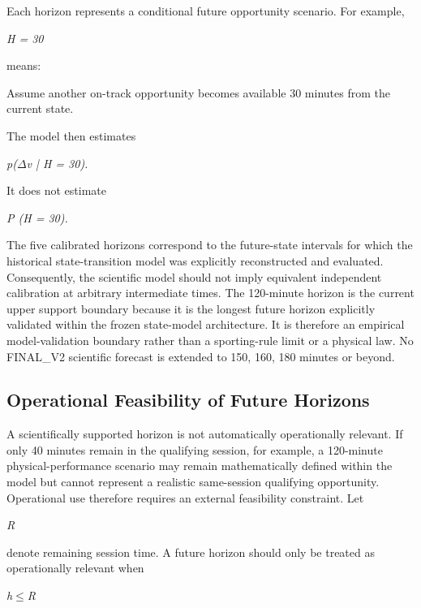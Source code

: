 Each horizon represents a conditional future opportunity scenario. For example,

\begin{center}\textit{H = 30}\end{center}

means:

Assume another on-track opportunity becomes available 30 minutes from the current state.

The model then estimates

\begin{center}\textit{p(\ensuremath{\Delta}v | H = 30).}\end{center}

It does not estimate

\begin{center}\textit{P (H = 30).}\end{center}

The five calibrated horizons correspond to the future-state intervals for which the historical state-transition model was explicitly reconstructed and evaluated. Consequently, the scientific model should not imply equivalent independent calibration at arbitrary intermediate times. The 120-minute horizon is the current upper support boundary because it is the longest future horizon explicitly validated within the frozen state-model architecture. It is therefore an empirical model-validation boundary rather than a sporting-rule limit or a physical law. No FINAL\_V2 scientific forecast is extended to 150, 160, 180 minutes or beyond.

\subsection{Operational Feasibility of Future Horizons}
A scientifically supported horizon is not automatically operationally relevant. If only 40 minutes remain in the qualifying session, for example, a 120-minute physical-performance scenario may remain mathematically defined within the model but cannot represent a realistic same-session qualifying opportunity. Operational use therefore requires an external feasibility constraint. Let

\begin{center}\textit{R}\end{center}

denote remaining session time. A future horizon should only be treated as operationally relevant when

\begin{center}\textit{h\ensuremath{\le}R}\end{center}

